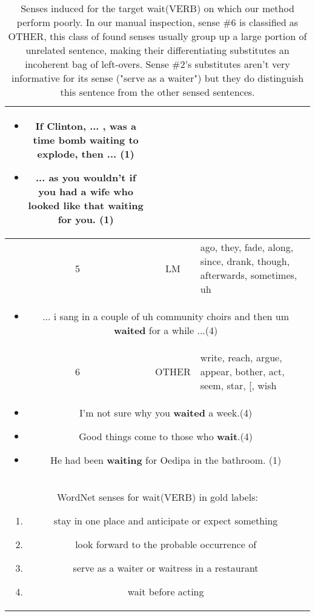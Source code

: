 \documentclass[11pt,a4paper]{article}
\begin{document}
\begin{table*}[ht!]
\begin{tabularx}{\linewidth}{| c | c | X  |}
{\begin{itemize}[topsep=0pt,itemsep=0pt,partopsep=0pt, parsep=0pt]
        \item If Clinton, ... , was a time bomb {\bf waiting} to explode, then ... (1)
      \item ... as you wouldn't if you had a wife who looked like that {\bf waiting} for you. (1)
    \end{itemize}
  }\\
  \hline\hline
    5  & LM & ago, they, fade, along, since, drank, though, afterwards, sometimes, uh \\ \hline
    \multicolumn{3}{|p{0.92\linewidth}|}{
    \begin{itemize}[topsep=0pt,itemsep=0pt,partopsep=0pt, parsep=0pt]
        \item ... i sang in a couple of uh community choirs and then um {\bf waited} for a while ...(4)
    \end{itemize}
  }\\
  \hline\hline
  6  & OTHER& write, reach, argue, appear, bother, act, seem, star, [, wish \\ \hline
    \multicolumn{3}{|p{0.92\linewidth}|}{
    \begin{itemize}[topsep=0pt,itemsep=0pt,partopsep=0pt, parsep=0pt]
        \item  I'm not sure why you {\bf waited} a week.(4)
        \item  Good things come to those who {\bf wait}.(4)
        \item  He had been {\bf waiting} for Oedipa in the bathroom. (1)
    \end{itemize}}\\
  \hline\hline
    \multicolumn{3}{|p{0.92\linewidth}|}{
    WordNet senses for wait(VERB) in gold labels:
    \begin{enumerate}
        [topsep=2pt,itemsep=0pt,partopsep=0pt, parsep=0pt]
        \item stay in one place and anticipate or expect something
        \item look forward to the probable occurrence of
        \item serve as a waiter or waitress in a restaurant
        \item wait before acting
    \end{enumerate}}\\
  
  \hline
\end{tabularx}
\caption{Senses induced for the target wait(VERB) on which our method perform poorly. In our manual inspection, sense \#6 is classified as OTHER, this class of found senses usually group up a large portion of unrelated sentence, making their differentiating substitutes an incoherent bag of left-overs. Sense \#2's substitutes aren't very informative for its sense ("serve as a waiter") but they do distinguish this sentence from the other sensed sentences.}
  \label{tab:examples2}
\end{table*}
\end{document}
